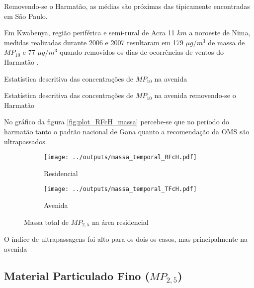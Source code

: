 Removendo-se o Harmatão, as médias são próximas das tipicamente
encontradas em São Paulo. 

Em Kwabenya, região periférica e semi-rural de Acra 11 $km$ a noroeste de Nima, 
medidas realizadas durante 2006 e 2007 resultaram em 179 $\mu g / m^3$ de massa 
de $MP_{10}$ e 77 $\mu g / m^3$ quando removidos os dias de ocorrências
de ventos do Harmatão \citep{aboh2009}.

\begin{table}[H]
  \centering
    
  \caption{Estatística descritiva das concentrações de $MP_{10}$ na 
           avenida \label{table:TIcH_descriptive}}
\end{table}

\begin{table}[H]
  \centering
    
  \caption{Estatística descritiva das concentrações de $MP_{10}$ na 
           avenida removendo-se o Harmatão
           \label{table:TIsH_descriptive}}
\end{table}

No gráfico da figura \ref{fig:plot_RFcH_massa} percebe-se que no período 
do harmatão tanto o padrão nacional de Gana quanto a recomendação da OMS 
são ultrapassados.

\begin{figure}[H]
  \centering
  \begin{subfigure}[b]{0.45\textwidth}
    \texttt{[image: ../outputs/massa\_temporal\_RFcH.pdf]}
    \caption{Residencial}
  \end{subfigure}%
  \begin{subfigure}[b]{0.45\textwidth}
    \texttt{[image: ../outputs/massa\_temporal\_TFcH.pdf]}
    \caption{Avenida}
  \end{subfigure}
  \caption{Massa total de $MP_{2,5}$ na área residencial \label{fig:massa_temporal_fino}}
\end{figure}

O índice de ultrapassagens foi alto para os dois os casos, 
mas principalmente na avenida

\subsection{Material Particulado Fino ($MP_{2,5}$)}

